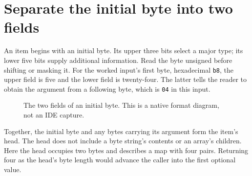 \section{Separate the initial byte into two fields}
An item begins with an initial byte. Its upper three bits select a major type; its
lower five bits supply additional information. Read the byte unsigned before shifting
or masking it. For the worked input's first byte, hexadecimal \texttt{b8}, the upper
field is five and the lower field is twenty-four. The latter tells the reader to obtain
the argument from a following byte, which is \texttt{04} in this input.

\begin{figure}[htbp]
  \centering
  \caption{The two fields of an initial byte. This is a native format diagram, not an IDE capture.}
\end{figure}

Together, the initial byte and any bytes carrying its argument form the item's head.
The head does not include a byte string's contents or an array's children. Here the
head occupies two bytes and describes a map with four pairs. Returning four as the
head's byte length would advance the caller into the first optional value.

